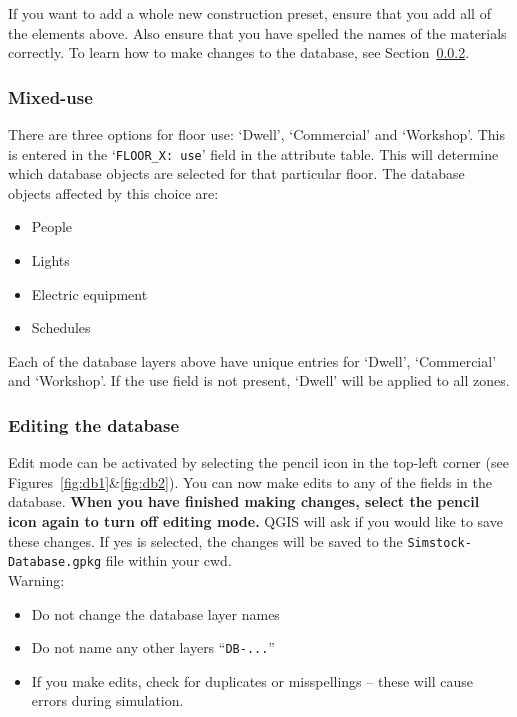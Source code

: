 \documentclass{article}
\begin{document}
If you want to add a whole new construction preset, ensure that you add all of the elements above. Also ensure that you have spelled the names of the materials correctly. To learn how to make changes to the database, see Section~\ref{section:editingdb}.

\subsubsection{Mixed-use}
\label{section:mixeduse}
There are three options for floor use: `Dwell', `Commercial' and `Workshop'. This is entered in the `\texttt{FLOOR\_X:~use}' field in the attribute table. This will determine which database objects are selected for that particular floor. The database objects affected by this choice are:
\begin{itemize}
    \item People
    \item Lights
    \item Electric equipment
    \item Schedules
\end{itemize}
Each of the database layers above have unique entries for `Dwell', `Commercial' and `Workshop'. If the use field is not present, `Dwell' will be applied to all zones.

\subsubsection{Editing the database}
\label{section:editingdb}
Edit mode can be activated by selecting the pencil icon in the top-left corner (see Figures~\ref{fig:db1}\&\ref{fig:db2}). You can now make edits to any of the fields in the database. \textbf{When you have finished making changes, select the pencil icon again to turn off editing mode.} QGIS will ask if you would like to save these changes. If yes is selected, the changes will be saved to the \texttt{Simstock-Database.gpkg} file within your cwd. \\

Warning:
\begin{itemize}
    \item Do not change the database layer names
    \item Do not name any other layers ``\texttt{DB-...}''
    \item If you make edits, check for duplicates or misspellings -- these will cause errors during simulation.
\end{itemize}
\end{document}
